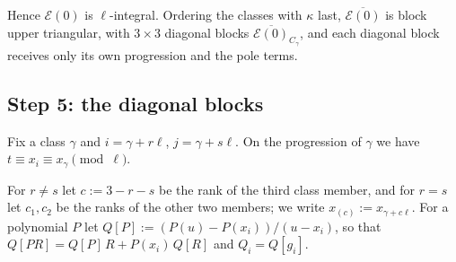 \documentclass[11pt]{amsart}
\theoremstyle{definition}
\theoremstyle{remark}
\numberwithin{equation}{section}
\begin{document}
Hence $\mathcal E(0)$ is $\ell$-integral. Ordering the classes with $\kappa$ last, $\overline{\mathcal E(0)}$ is block upper triangular,
with $3\times3$ diagonal blocks $\overline{\mathcal E(0)}_{C_\gamma}$, and each diagonal block receives only its own progression
and the pole terms.

\subsection{Step 5: the diagonal blocks}
Fix a class $\gamma$ and $i=\gamma+r\ell$, $j=\gamma+s\ell$. On the progression of $\gamma$ we have $t\equiv x_i\equiv x_\gamma\pmod\ell$.

For $r\ne s$ let $c:=3-r-s$ be the rank of the third class member, and for $r=s$ let $c_1,c_2$ be the ranks of the
other two members; we write $x_{(c)}:=x_{\gamma+c\ell}$. For a polynomial $P$ let $Q[P]:=(P(u)-P(x_i))/(u-x_i)$, so that
$Q[PR]=Q[P]\,R+P(x_i)\,Q[R]$ and $Q_i=Q[g_i]$.
\end{document}
